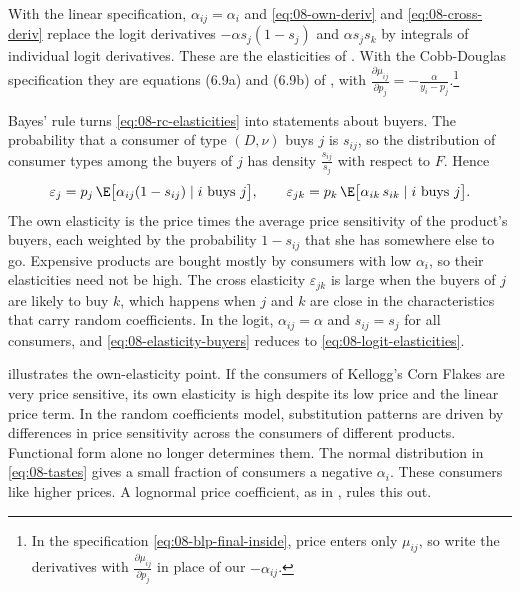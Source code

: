 With the linear specification, $\alpha_{ij} = \alpha_i$ and \eqref{eq:08-own-deriv} and \eqref{eq:08-cross-deriv}
replace the logit derivatives $-\alpha s_j(1 - s_j)$ and $\alpha s_j s_k$ by integrals of individual logit
derivatives. These are the elasticities of \citet[p.~525]{Nevo2000a}. With the Cobb-Douglas specification they
are equations (6.9a) and (6.9b) of \citet{BerryLevinsohnPakes1995}, with $\frac{\partial\mu_{ij}}{\partial p_j}
= -\frac{\alpha}{y_i - p_j}$.\footnote{In the specification \eqref{eq:08-blp-final-inside}, price enters only
$\mu_{ij}$, so \citet{BerryLevinsohnPakes1995} write the derivatives with $\frac{\partial \mu_{ij}}{\partial
p_j}$ in place of our $-\alpha_{ij}$.}

Bayes' rule turns \eqref{eq:08-rc-elasticities} into statements about buyers. The probability that a consumer of
type $(D, \nu)$ buys $j$ is $s_{ij}$, so the distribution of consumer types among the buyers of $j$ has density
$\frac{s_{ij}}{s_j}$ with respect to $F$. Hence
\begin{equation}\label{eq:08-elasticity-buyers}
  \varepsilon_j = p_j\, \E\bigl[\alpha_{ij}(1 - s_{ij}) \mid i \text{ buys } j\bigr], \qquad
  \varepsilon_{jk} = p_k\, \E\bigl[\alpha_{ik}\, s_{ik} \mid i \text{ buys } j\bigr].
\end{equation}
The own elasticity is the price times the average price sensitivity of the product's buyers, each weighted by
the probability $1 - s_{ij}$ that she has somewhere else to go. Expensive products are bought mostly by consumers
with low $\alpha_i$, so their elasticities need not be high. The cross elasticity $\varepsilon_{jk}$ is large
when the buyers of $j$ are likely to buy $k$, which happens when $j$ and $k$ are close in the characteristics
that carry random coefficients. In the logit, $\alpha_{ij} = \alpha$ and $s_{ij} = s_j$ for all consumers, and
\eqref{eq:08-elasticity-buyers} reduces to \eqref{eq:08-logit-elasticities}.

\citet[pp.~525--526]{Nevo2000a} illustrates the own-elasticity point. If the consumers of Kellogg's Corn Flakes
are very price sensitive, its own elasticity is high despite its low price and the linear price term. In the
random coefficients model, substitution patterns are driven by differences in price sensitivity across the
consumers of different products. Functional form alone no longer determines them. The normal distribution in
\eqref{eq:08-tastes} gives a small fraction of consumers a negative $\alpha_i$. These consumers like higher prices. A
lognormal price coefficient, as in \citet{BerryLevinsohnPakes2004}, rules this out.

